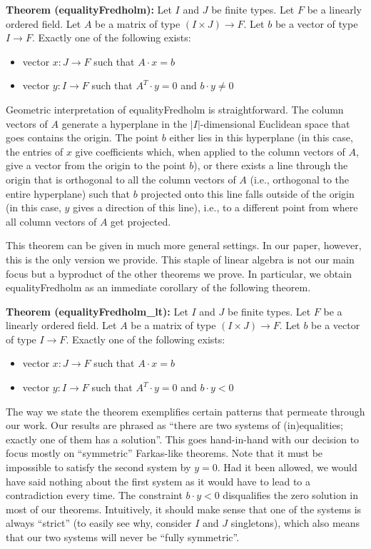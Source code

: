 \documentclass[]{article}
\renewcommand{\.}{\hskip .75pt}
\let\r=\rightarrow
\let\*=\cdot
\begin{document}
\medskip \noindent
\textbf{Theorem (equalityFredholm):}
Let $I$ and $J$ be finite types.
Let $F$ be a linearly ordered field.
Let $A$ be a matrix of type $(I \times J) \r F$.
Let $b$ be a vector of type $I \r F$.
Exactly one of the following exists:
\begin{itemize}
\item vector $x : J \r F$ such that $A \* x = b$
\item vector $y : I \r F$ such that $A^T\! \* y = 0$ and $b \* y \neq 0$
\end{itemize}
Geometric interpretation of equalityFredholm is straightforward.
The column vectors of $A$ generate a hyperplane in the
$|I|$-dimensional Euclidean space that goes contains the origin.
The point $b$ either lies in this hyperplane (in this case, the entries
of $x$ give coefficients which, when applied to the column vectors of $A$,
give a vector from the origin to the point $b$),
or there exists a line through the origin that is orthogonal to
all the column vectors of $A$ (i.e., orthogonal to the entire hyperplane)
such that $b$ projected onto this line falls outside of the origin
(in this case, $y$ gives a direction of this line), i.e., to a different point
from where all column vectors of $A$ get projected.

This theorem can be given in much more general settings.
In our paper, however, this is the only version we provide.
This staple of linear algebra is not our main focus
but a byproduct of the other theorems we prove.
In particular, we obtain equalityFredholm as an immediate corollary
of the following theorem.

\medskip \noindent
\textbf{Theorem (equalityFredholm\_lt):}
Let $I$ and $J$ be finite types.
Let $F$ be a linearly ordered field.
Let $A$ be a matrix of type $(I \times J) \r F$.
Let $b$ be a vector of type $I \r F$.
Exactly one of the following exists:
\begin{itemize}
\item vector $x : J \r F$ such that $A \* x = b$
\item vector $y : I \r F$ such that $A^T\! \* y = 0$ and $b \* y < 0$
\end{itemize}
The way we state the theorem exemplifies certain patterns that
permeate through our work. Our results are phrased as
``there are two systems of (in)equalities; exactly one of them has a solution''.
This goes hand-in-hand with our decision to focus mostly on ``symmetric'' Farkas-like theorems.
Note that it must be impossible to satisfy the second system by $y=0$.
Had it been allowed, we would have said nothing about the first system as it would
have to lead to a contradiction every time. The constraint $b \* y < 0$ disqualifies
the zero solution in most of our theorems. Intuitively, it should make sense that
one of the systems is always ``strict'' (to easily see why, consider $I$ and $J$ singletons),
which also means that our two systems will never be ``fully symmetric''.
\end{document}
